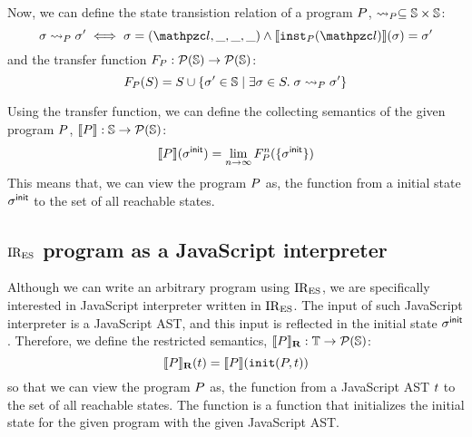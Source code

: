 Now, we can define the state transistion relation
of a program $P$, $\leadsto_{P} \subseteq \mathbb{S} \times \mathbb{S}$:
\[
  \st \trans{\prog} \st' \iff
  \st = (\lab, \_, \_, \_) \wedge
  \sem{\getinst{\prog}(\lab)}(\st) = \st'
\]
and the transfer function $F_{P}: \mathcal{P}(\mathbb{S}) \rightarrow \mathcal{P}(\mathbb{S})$:
\[
  F_{P}(S) = S \cup \{ \sigma' \in \mathbb{S} \mid \exists \sigma \in S. \; \sigma \leadsto_{P} \sigma' \}
\]

Using the transfer function, we can define the collecting semantics of the given program $P$,
$\llbracket{P}\rrbracket: \mathbb{S} \rightarrow \mathcal{P}(\mathbb{S})$:
\[
  \llbracket{P}\rrbracket(\sigma^{\textsf{init}}) = \lim_{n \rightarrow \infty}F_{P}^n( \{ \sigma^{\textsf{init}} \} ) \\
\]
This means that, we can view the program $P$ as, the function from a initial state
$\sigma^{\textsf{init}}$ to the set of all reachable states.

\subsection{$\text{IR}_\text{ES}$ program as a JavaScript interpreter}
Although we can write an arbitrary program using $\text{IR}_\text{ES}$, we are specifically interested in
JavaScript interpreter written in $\text{IR}_\text{ES}$. The input of such JavaScript interpreter is a JavaScript AST,
and this input is reflected in the initial state $\sigma^{\textsf{init}}$.
Therefore, we define the restricted semantics,
$\llbracket{P}\rrbracket_\textbf{R}: \mathbb{T} \rightarrow \mathcal{P}(\mathbb{S})$:
\[
  \rsem{\prog}(\tree) = \sem{\prog}( \getinitst(\prog, \tree) ) \\
\]
so that we can view the program $P$ as, the function from a JavaScript AST
$t$ to the set of all reachable states. The \getinitst function is a function
that initializes the initial state for the given program with the given JavaScript AST.

